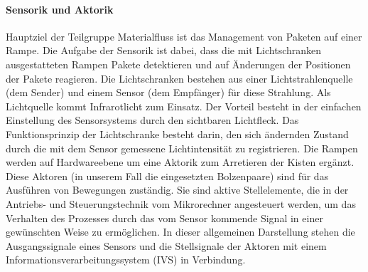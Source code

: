 \paragraph{ Sensorik und Aktorik}
Hauptziel der Teilgruppe Materialfluss ist das Management von Paketen auf einer Rampe.
Die Aufgabe der Sensorik ist dabei, dass die mit Lichtschranken ausgestatteten Rampen Pakete detektieren und auf \"Anderungen der Positionen der Pakete reagieren.
Die Lichtschranken bestehen aus einer Lichtstrahlenquelle (dem Sender) und einem Sensor (dem Empf\"anger) f\"{u}r diese Strahlung.
Als Lichtquelle kommt Infrarotlicht zum Einsatz.
Der Vorteil besteht in der einfachen Einstellung des Sensorsystems durch den sichtbaren Lichtfleck.
Das Funktionsprinzip der Lichtschranke besteht darin, den sich  \"andernden Zustand durch die mit dem Sensor gemessene Lichtintensit\"at zu registrieren. 
Die Rampen werden auf Hardwareebene um eine Aktorik zum Arretieren der Kisten erg\"anzt. Diese Aktoren (in unserem Fall die eingesetzten Bolzenpaare) sind f\"ur das Ausf\"uhren von Bewegungen zust\"andig.
Sie sind aktive Stellelemente, die in der Antriebs- und Steuerungstechnik vom  Mikrorechner angesteuert werden, um das Verhalten des Prozesses durch das vom Sensor kommende Signal in einer gew\"{u}nschten Weise zu erm\"oglichen. In dieser allgemeinen Darstellung stehen die 
Ausgangssignale eines Sensors und die Stellsignale der Aktoren mit einem
Informationsverarbeitungssystem (IVS) in Verbindung.